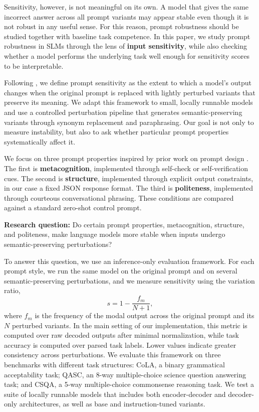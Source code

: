 \documentclass[11pt]{article}
\begin{document}
Sensitivity, however, is not meaningful on its own. A model that gives the same incorrect answer across all prompt variants may appear stable even though it is not robust in any useful sense. For this reason, prompt robustness should be studied together with baseline task competence. In this paper, we study prompt robustness in SLMs through the lens of \textbf{input sensitivity}, while also checking whether a model performs the underlying task well enough for sensitivity scores to be interpretable.

Following \citet{lu-etal-2024-prompts}, we define prompt sensitivity as the extent to which a model's output changes when the original prompt is replaced with lightly perturbed variants that preserve its meaning. We adapt this framework to small, locally runnable models and use a controlled perturbation pipeline that generates semantic-preserving variants through synonym replacement and paraphrasing. Our goal is not only to measure instability, but also to ask whether particular prompt properties systematically affect it.

We focus on three prompt properties inspired by prior work on prompt design \citep{long-etal-2025-makes}. The first is \textbf{metacognition}, implemented through self-check or self-verification cues. The second is \textbf{structure}, implemented through explicit output constraints, in our case a fixed JSON response format. The third is \textbf{politeness}, implemented through courteous conversational phrasing. These conditions are compared against a standard zero-shot control prompt.

\textbf{Research question:} Do certain prompt properties, metacognition, structure, and politeness, make language models more stable when inputs undergo semantic-preserving perturbations?

To answer this question, we use an inference-only evaluation framework. For each prompt style, we run the same model on the original prompt and on several semantic-preserving perturbations, and we measure sensitivity using the variation ratio,
\[
s = 1 - \frac{f_m}{N+1},
\]
where $f_m$ is the frequency of the modal output across the original prompt and its $N$ perturbed variants. In the main setting of our implementation, this metric is computed over raw decoded outputs after minimal normalization, while task accuracy is computed over parsed task labels. Lower values indicate greater consistency across perturbations. We evaluate this framework on three benchmarks with different task structures: CoLA, a binary grammatical acceptability task; QASC, an 8-way multiple-choice science question answering task; and CSQA, a 5-way multiple-choice commonsense reasoning task. We test a suite of locally runnable models that includes both encoder-decoder and decoder-only architectures, as well as base and instruction-tuned variants.
\end{document}
